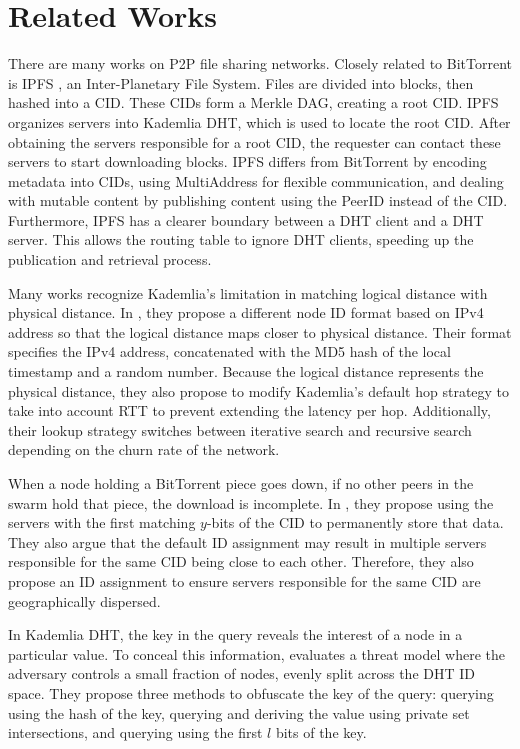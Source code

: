 \section{Related Works}
There are many works on P2P file sharing networks. Closely related to BitTorrent is IPFS \cite{IPFS2022}, an Inter-Planetary File System.
Files are divided into blocks, then hashed into a \ac{CID}. These CIDs form a Merkle \ac{DAG}, creating a root CID.
IPFS organizes servers into Kademlia DHT, which is used to locate the root CID.
After obtaining the servers responsible for a root CID, the requester can contact these servers to start downloading blocks.
IPFS differs from BitTorrent by encoding metadata into CIDs, using MultiAddress for flexible communication, and dealing with mutable content by publishing content
using the PeerID instead of the CID.
Furthermore, IPFS has a clearer boundary between a DHT client and a DHT server. This allows the routing table to ignore DHT clients, speeding up the publication and retrieval process.

Many works recognize Kademlia's limitation in matching logical distance with physical distance.
In \cite{KademliaRouting}, they propose a different node ID format based on IPv4 address so that the logical distance maps closer to physical distance.
Their format specifies the IPv4 address, concatenated with the MD5 hash of the local timestamp and a random number.
Because the logical distance represents the physical distance, they also propose to modify Kademlia's default hop strategy to take into account RTT to prevent extending the latency per hop.
Additionally, their lookup strategy switches between iterative search and recursive search depending on the churn rate of the network.

When a node holding a BitTorrent piece goes down, if no other peers in the swarm hold that piece, the download is incomplete.
In \cite{IPFSAvailability}, they propose using the servers with the first matching $y$-bits of the CID to permanently store that data.
They also argue that the default ID assignment may result in multiple servers responsible for the same CID being close to each other.
Therefore, they also propose an ID assignment to ensure servers responsible for the same CID are geographically dispersed.

In Kademlia DHT, the key in the query reveals the interest of a node in a particular value.
To conceal this information, \cite{KademliaQueryObfuscation} evaluates a threat model where the adversary controls a small fraction of nodes, evenly split across the DHT ID space.
They propose three methods to obfuscate the key of the query: querying using the hash of the key, querying and deriving the value using private set intersections,
and querying using the first $l$ bits of the key.
